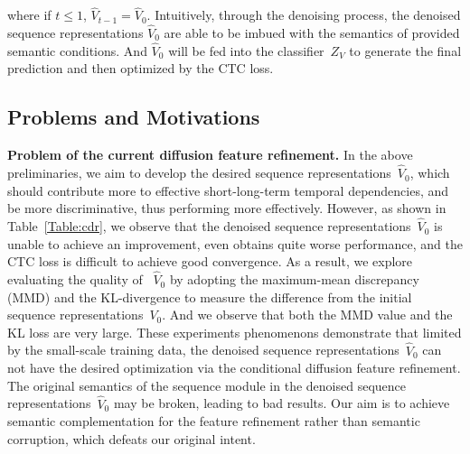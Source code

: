 \documentclass[sigconf]{acmart}
\begin{document}
\noindent where if $t \le 1 $, ${\widehat{V}_{t - 1}} = {\widehat V_0}$. Intuitively, through the denoising process, the denoised sequence representations ${\widehat V_0}$ are able to be imbued with the semantics of provided semantic conditions. And ${\widehat V_0}$ will be fed into the classifier~$Z_V$ to generate the final prediction and then optimized by the CTC loss.

\subsection{Problems and Motivations}
\noindent \textbf{Problem of the current diffusion feature refinement.}
In the above preliminaries, we aim to develop the desired sequence representations~${\widehat V_0}$, which should contribute more to effective short-long-term temporal dependencies, and be more discriminative, thus performing more effectively.
However, as shown in Table~\ref{Table:cdr}, we observe that the denoised sequence representations~${\widehat V_0}$ is unable to achieve an improvement, even obtains quite worse performance, and the CTC loss is difficult to achieve good convergence.
As a result, we explore evaluating the quality of ~${\widehat V_0}$  by adopting the maximum-mean discrepancy (MMD) and the KL-divergence to measure the difference from the initial sequence representations~${V_0}$.
And we observe that both the MMD value and the KL loss are very large.
These experiments phenomenons demonstrate that limited by the small-scale training data, the denoised sequence representations~${\widehat V_0}$ can not have the desired optimization via the conditional diffusion feature refinement.
The original semantics of the sequence module in the denoised sequence representations~${\widehat V_0}$ may be broken, leading to bad results.
Our aim is to achieve semantic complementation for the feature refinement rather than semantic corruption, which defeats our original intent.
\setlength{\tabcolsep}{5pt}
\end{document}
